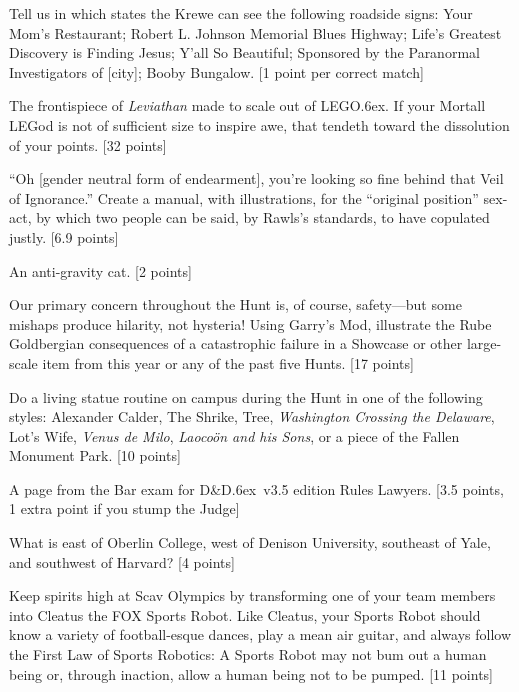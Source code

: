 \documentclass{book}
\def\tr{\raise.6ex\hbox{\scriptsize \textregistered}}
\begin{document}
\begin{list}{}{}
\item Tell us in which states the Krewe can see the following roadside signs: Your Mom's Restaurant; Robert L. Johnson Memorial Blues Highway; Life's Greatest Discovery is Finding Jesus; Y'all So Beautiful; Sponsored by the Paranormal Investigators of [city]; Booby Bungalow. [1 point per correct match] 

\item The frontispiece of \emph{Leviathan} made to scale out of LEGO\tr.  If your Mortall LEGod is not of sufficient size to inspire awe, that tendeth toward the dissolution of your points. [32 points]

\item ``Oh [gender neutral form of endearment], you're looking so fine behind that Veil of Ignorance.'' Create a  manual, with illustrations, for the ``original position'' sex-act, by which two people can be said, by Rawls's standards, to have copulated justly. [6.9 points]

\item An anti-gravity cat. [2 points]

\item Our primary concern throughout the Hunt is, of course, safety---but some mishaps produce hilarity, not hysteria! Using Garry's Mod, illustrate the Rube Goldbergian consequences of a catastrophic failure in a Showcase or other large-scale item from this year or any of the past five Hunts. [17 points]

\item Do a living statue routine on campus during the Hunt in one of the following styles: Alexander Calder, The Shrike, Tree, \emph{Washington Crossing the Delaware}, Lot's Wife, \emph{Venus de Milo}, \emph{Laoco\"{o}n and his Sons}, or a piece of the Fallen Monument Park.  [10 points]

\item A page from the Bar exam for D\&D\tr\  v3.5 edition Rules Lawyers. [3.5 points, 1 extra point if you stump the Judge]

\item What is east of Oberlin College, west of Denison University, southeast of Yale, and southwest of Harvard?  [4 points]

\item Keep spirits high at Scav Olympics by transforming one of your team members into Cleatus the FOX Sports Robot. Like Cleatus, your Sports Robot should know a variety of football-esque dances, play a mean air guitar, and always follow the First Law of Sports Robotics: A Sports Robot may not bum out a human being or, through inaction, allow a human being not to be pumped. [11 points]


\end{list}
\end{document}

